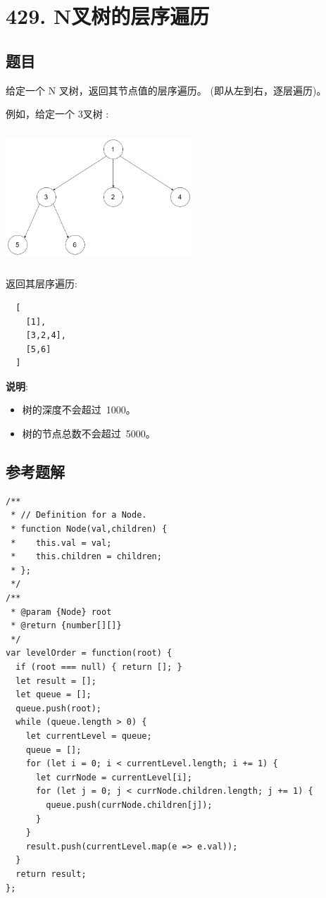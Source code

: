 \newpage
\section{429. N叉树的层序遍历}
\label{leetcode:429}

\subsection{题目}

给定一个 N 叉树，返回其节点值的层序遍历。 (即从左到右，逐层遍历)。

例如，给定一个 3叉树 :

\includegraphics[width=70mm,height=50mm]{images/leetcode/leetcode_429_narytreeexample.png}

返回其层序遍历:

\begin{verbatim}
  [
    [1],
    [3,2,4],
    [5,6]
  ]
\end{verbatim}

\textbf{说明}:

\begin{itemize}
  \item 树的深度不会超过 1000。
  \item 树的节点总数不会超过 5000。
\end{itemize}

\subsection{参考题解}

\begin{verbatim}
/**
 * // Definition for a Node.
 * function Node(val,children) {
 *    this.val = val;
 *    this.children = children;
 * };
 */
/**
 * @param {Node} root
 * @return {number[][]}
 */
var levelOrder = function(root) {
  if (root === null) { return []; }
  let result = [];
  let queue = [];
  queue.push(root);
  while (queue.length > 0) {
    let currentLevel = queue;
    queue = [];
    for (let i = 0; i < currentLevel.length; i += 1) {
      let currNode = currentLevel[i];
      for (let j = 0; j < currNode.children.length; j += 1) {
        queue.push(currNode.children[j]);
      }
    }
    result.push(currentLevel.map(e => e.val));
  }
  return result;
};
\end{verbatim}
